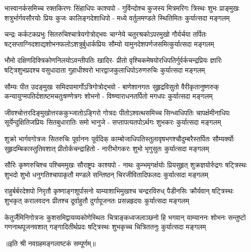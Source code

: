 
\fourlineindentedshloka
{भास्वानर्कसमिच्च रक्तकिरणः सिंहाधिपः काश्यपो -}
{गुर्विन्दोश्च कुजस्य मित्रमरिगः त्रिस्थः शुभः प्राङ्मुखः}
{शत्रुर्भार्गवसौरयोः प्रियः कुजः कालिङ्गदेशाधिपो -}
{मध्ये वर्तुलमण्डले स्थितिमितः कुर्यात्सदा मङ्गलम्}

\fourlineindentedshloka
{चन्द्रः कर्कटकप्रभुः सितरुचिश्चात्रेयगोत्रोद्भवः}
{चाग्नेये चतुरश्रकोऽपरमुखो गौर्यर्चया तर्पितः}
{षट्सप्ताग्निदशाद्यशोभनफलोऽशत्रुर्बुधार्कप्रियः}
{सौम्यो यामुनदेशपर्णजसमित्कुर्यात्सदा मङ्गलम्}

\fourlineindentedshloka
{भौमो दक्षिणदिक्त्रिकोणनिलयोऽवन्तीपतिः खादिर-}
{प्रीतो वृश्चिकमेषयोरधिपतिर्गुर्वर्कचन्द्रप्रियः}
{ज्ञारिः षट्त्रिशुभप्रदश्च वसुधादाता गुहाधीश्वरो}
{भारद्वाजकुलाधिपोऽरुणरुचिः कुर्यात्सदा मङ्गलम्}

\fourlineindentedshloka
{सौम्यः पीत उदङ्मुखः समिदपामार्गोऽत्रिगोत्रोद्भवो -}
{बाणेशानगतः सुहृद्रविसुतो वैरीकृतानुष्णरुक्}
{कन्यायुग्मपतिर्दशाष्टमचतुःषण्णेत्रगः शोभनो -}
{विष्ण्वाराधनतर्पितो मगधपः कुर्यात्सदा मङ्गलम्}

\fourlineindentedshloka
{जीवश्चोत्तरदिङ्मुखोत्तरककुभ्जातोऽङ्गिरो गोत्रदः}
{पीतोऽश्वत्थसमिच्च सिन्ध्वधिपतिः चापर्क्षमीनाधिपः}
{सूर्येन्दुक्षितिजप्रियः सितबुधारातिः समो भानुजे -}
{सप्तापत्यतपोऽर्थगः शुभकरः कुर्यात्सदा मङ्गलम्}

\fourlineindentedshloka
{शुक्रो भार्गवगोत्रजः सितरुचिः पूर्वाननः पूर्वदिक्}
{काम्बोजाधिपतिस्तुलावृषभगश्चौदुम्बरैस्तर्पितः}
{सौम्यर्क्योः सुहृदम्बिकास्तुतिवशात् प्रीतोर्कचन्द्राहितो -}
{नारीभोगकरः शुभो भृगुसुतः कुर्यात्सदा मङ्गलम्}

\fourlineindentedshloka
{सौरिः कृष्णरुचिश्च पश्चिममुखः सौराष्ट्रपः काश्यपो -}
{नाथः कुम्भमृगर्क्षयोः प्रियसुहृत् शुक्रज्ञयोर्रुद्रगः}
{षट्त्रिस्थः शुभदो शुभो  धनुगतिश्चापाकृतौ मण्डले}
{सन्तिष्ठन् चिरजीवितादिफलदः कुर्यात्सदा मङ्गलम्}

\fourlineindentedshloka
{राहुर्बर्बरदेशपो  निरृतौ कृष्णाङ्गशूर्पासनो}
{याम्याशाभिमुखश्च चन्द्ररविरुध् पैडीनसिः क्रौर्यवान्}
{षट्त्रिस्थः शुभकृत् करालवदनः प्रीतश्च दूर्वाहुतौ}
{दुर्गापूजनतः प्रसन्नहृदयः कुर्यात्सदा मङ्गलम्}

\fourlineindentedshloka
{केतुर्जैमिनिगोत्रजः कुशसमिद्वायव्यकोणेस्थितः}
{चित्राङ्कध्वजलाञ्छनो हि भगवान् याम्याननः शोभनः}
{सन्तुष्टो गणनाथपूजनवशात् गङ्गादितीर्थप्रदः}
{षट्त्रिस्थः शुभकृच्च चित्रिततनुः कुर्यात्सदा मङ्गलम्}

॥इति श्री नवग्रहमङ्गलाष्टकं सम्पूर्णम्॥